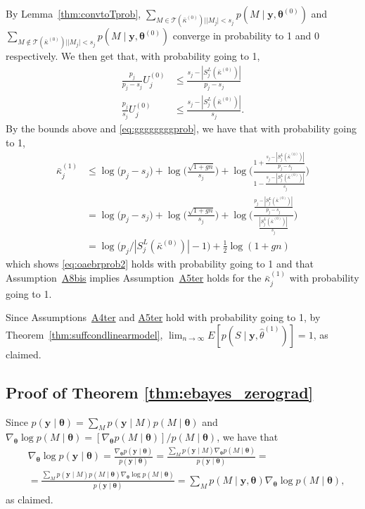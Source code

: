 \documentclass[
  12pt]{article}
\newcommand{\T}{\mathcal{T}}
\newcommand{\by}{\mathbf{y}}
\newcommand{\btheta}{\boldsymbol{\theta}}
\begin{document}
By Lemma~\ref{thm:convtoTprob}, $\sum_{M \in  \T(\bar{\kappa}^{(0)})| |M_j| < s_j}p(M\mid \by, \btheta^{(0)})$ and $\sum_{M  \not\in \T(\bar{\kappa}^{(0)})| |M_j| < s_j}p(M\mid \by, \btheta^{(0)})$ converge in probability to 1 and 0 respectively. We then get that, with probability going to 1,
\begin{align}
    \frac{p_j}{p_j-s_j}U^{(0)}_j &\leq \frac{s_j-|S^{L}_j(\bar{\kappa}^{(0)})|}{p_j-s_j}\nonumber\\
    \frac{p_j}{s_j}U^{(0)}_j &\leq  \frac{s_j-|S^{L}_j(\bar{\kappa}^{(0)})|}{s_j}. \label{eq:gewouprob}
\end{align}
By the bounds above and \eqref{eq:ggggggggprob}, we have that with probability going to 1,
\begin{align}
  \bar{\kappa}^{(1)}_j 
  &\leq \log\big(p_j-s_j\big)+\log\Big(\frac{\sqrt{1+gn}}{s_j}\Big)+\log\Bigg(\frac{1+\frac{s_j-|S^{L}_j(\bar{\kappa}^{(0)})|}{p_j-s_j}}{1- \frac{s_j-|S^{L}_j(\bar{\kappa}^{(0)})|}{s_j}}\Bigg) \nonumber\\
  &= \log\big(p_j-s_j\big) + \log\Big(\frac{\sqrt{1+gn}}{s_j}\Big) + \log\Bigg(\frac{\frac{p_j-|S^{L}_j(\bar{\kappa}^{(0)})|}{p_j-s_j}}{ \frac{|S^{L}_j(\bar{\kappa}^{(0)})|}{s_j}}\Bigg) \\
&=\log\big(p_j/|S^{L}_j(\bar{\kappa}^{(0)})|-1\big)+\frac{1}{2}\log(1+gn)\label{eq:finalupperboundkappajprob}
\end{align}
which shows \eqref{eq:oaebrprob2} holds with probability going to 1 and that
Assumption~\hyperlink{lab:A8bis}{A8bis} implies Assumption~\hyperlink{lab:A5ter}{A5ter} holds for the $\bar{\kappa}^{(1)}_j$ with probability going to 1. 

Since Assumptions~\hyperlink{lab:A4ter}{A4ter} and \hyperlink{lab:A5ter}{A5ter} hold with probability going to 1, by Theorem~\ref{thm:suffcondlinearmodel}, $\lim_{n\to\infty}E \left[ p(S \mid \by, \hat{\theta}^{(1)}) \right]= 1$, as claimed.


\subsection{Proof of Theorem \ref{thm:ebayes_zerograd}}\label{proof:ebayes_zerograd}

Since $p(\by \mid \btheta)= \sum_{M} p(\by \mid M) p(M \mid \btheta)$
and $\nabla_{\btheta} \log p(M \mid \btheta)= [\nabla_{\btheta} p(M \mid \btheta)] / p(M \mid \btheta)$, we have that
\begin{align}
&\nabla_{\btheta}\log p(\by \mid \btheta)= \frac{\nabla_{\btheta} p(\by \mid \btheta)}{p(\by \mid \btheta)}= 
\frac{\sum_{M} p(\by \mid M) \nabla_{\btheta} p(M \mid \btheta)}{p(\by \mid \btheta)}= 
\nonumber \\
&= \frac{\sum_{M} p(\by \mid M) p(M \mid \btheta) \nabla_{\btheta} \log p(M \mid \btheta)}{p(\by \mid \btheta)}
= \sum_{M} p(M \mid \by, \btheta) \nabla_{\btheta} \log p(M \mid \btheta),
\nonumber
\end{align}
as claimed.
\end{document}

